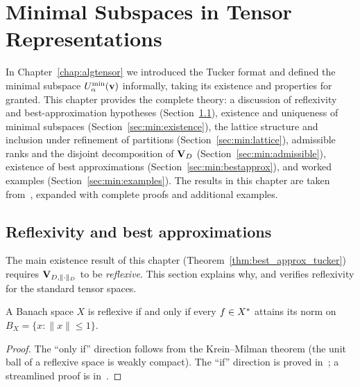 %
%

\chapter{Minimal Subspaces in Tensor Representations}
\label{chap:minsubspaces}

In Chapter~\ref{chap:algtensor} we introduced the Tucker format and
defined the minimal subspace $U^{\min}_{\alpha}(\mathbf{v})$ informally, taking
its existence and properties for granted. This chapter provides the
complete theory: a discussion of reflexivity and best-approximation
hypotheses (Section~\ref{sec:min:reflexivity}), existence and uniqueness
of minimal subspaces (Section~\ref{sec:min:existence}), the lattice
structure and inclusion under refinement of partitions
(Section~\ref{sec:min:lattice}), admissible ranks and the disjoint
decomposition of $\mathbf{V}_D$ (Section~\ref{sec:min:admissible}), existence of
best approximations (Section~\ref{sec:min:bestapprox}), and worked examples
(Section~\ref{sec:min:examples}). The results in this chapter are
taken from~\cite{FH2012}, expanded with complete proofs and additional
examples.

\section{Reflexivity and best approximations}
\label{sec:min:reflexivity}

The main existence result of this chapter
(Theorem~\ref{thm:best_approx_tucker}) requires $\mathbf{V}_{D,\|\cdot\|_D}$ to be
\emph{reflexive}. This section explains why, and verifies reflexivity
for the standard tensor spaces.

\begin{theorem}
\label{thm:james}
A Banach space $X$ is reflexive if and only if every $f \in X^*$
attains its norm on $B_X = \{x : \|x\| \leq 1\}$.
\end{theorem}

\begin{proof}
The ``only if'' direction follows from the Krein--Milman theorem (the
unit ball of a reflexive space is weakly compact). The ``if'' direction
is proved in~\cite{James1957}; a streamlined proof is in~\cite{Megginson1998}.
\end{proof}

